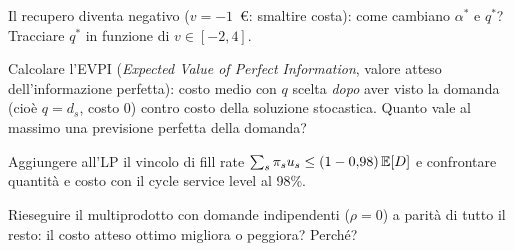 \begin{esercizio}[deperibili]
Il recupero diventa negativo ($v = -1$~\euro: smaltire costa): come cambiano
$\alpha^*$ e $q^*$? Tracciare $q^*$ in funzione di $v \in [-2, 4]$.
\end{esercizio}

\begin{esercizio}[EVPI]
Calcolare l'EVPI (\emph{Expected Value of Perfect Information}, valore atteso
dell'informazione perfetta): costo medio con $q$ scelta
\emph{dopo} aver visto la domanda (cioè $q = d_s$, costo 0) contro costo della
soluzione stocastica. Quanto vale al massimo una previsione perfetta della domanda?
\end{esercizio}

\begin{esercizio}
Aggiungere all'LP il vincolo di fill rate
$\sum_s \pi_s u_s \le (1 - 0{,}98)\,\mathbb{E}[D]$ e confrontare quantità e costo con il
cycle service level al 98\%.
\end{esercizio}

\begin{esercizio}[multiprodotto]
Rieseguire il multiprodotto con domande indipendenti ($\rho = 0$) a parità di tutto
il resto: il costo atteso ottimo migliora o peggiora? Perché?
\end{esercizio}
